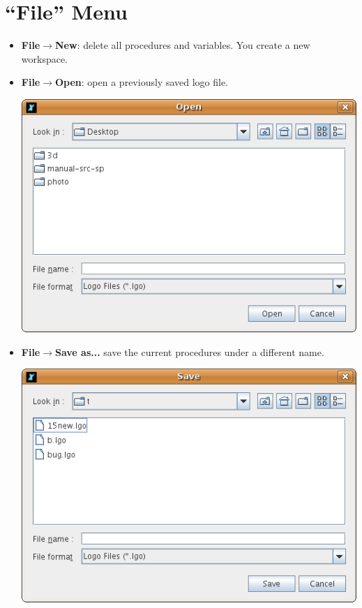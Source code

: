 \section{``File'' Menu}
\begin{itemize}
\item \textbf{File$\to$New}: delete all procedures and variables. You create a new workspace.\\
\item \textbf{File$\to$Open}: open a previously saved logo file. 
\begin{center}
 \includegraphics[scale=0.4]{pics/interface-CaptureOpen.png}
\end{center}
\vspace{0.25cm}
\item \textbf{File$\to$Save as...} save the current procedures under a different
name. 
\begin{center}
 \includegraphics[scale=0.4]{pics/interface-CaptureSave.png}

\end{center}
\end{itemize}
